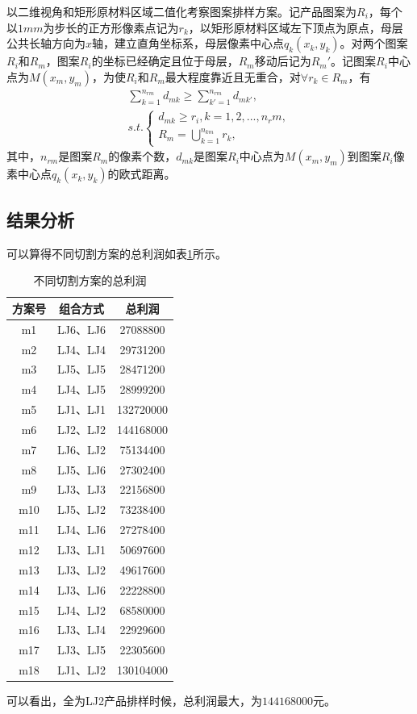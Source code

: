 \documentclass{whutmod}
\begin{document}
  	以二维视角和矩形原材料区域二值化考察图案排样方案。记产品图案为$R_i$，每个以$1mm$为步长的正方形像素点记为$r_k$，以矩形原材料区域左下顶点为原点，母层公共长轴方向为$x$轴，建立直角坐标系，母层像素中心点$q_k(x_k,y_k)$。对两个图案$R_i$和$R_m$，图案$R_i$的坐标已经确定且位于母层，$R_m$移动后记为$R_m'$。记图案$R_i$中心点为$M(x_m,y_m)$，为使$R_i$和$R_m$最大程度靠近且无重合，对$\forall r_k \in R_m$，有
  	\begin{gather}
  	\sum_{k=1}^{n_{rm}}d_{mk}\geq\sum_{k'=1}^{n_{rm}}d_{mk'},\\
  	s.t.\left\{\begin{matrix}
  	d_{mk}\geq r_i,k=1,2,...,n_rm,
  	\\ 
  	R_m=\bigcup_{k=1}^{n_{km}}r_k,
  	\end{matrix}\right.
  	\end{gather}
  	其中，$n_{rm}$是图案$R_m$的像素个数，$d_{mk}$是图案$R_i$中心点为$M(x_m,y_m)$到图案$R_i$像素中心点$q_k(x_k,y_k)$的欧式距离。
  	

  	\subsection{结果分析}
  	
  	可以算得不同切割方案的总利润如表\ref{sgzai}所示。
	\begin{table}[H]
		\centering		
		\caption{不同切割方案的总利润}\label{sgzai}
		\begin{tabular}{ccc}
			\toprule[2pt]
			\multicolumn{1}{m{3cm}}{\centering 方案号}
			& \multicolumn{1}{m{4cm}}{\centering 组合方式}
			& \multicolumn{1}{m{4cm}}{\centering 总利润}\\
			\midrule[1pt]
			m1 &  LJ6、LJ6&27088800\\ 
			m2 &  LJ4、LJ4&29731200\\ 
			m3 &  LJ5、LJ5&28471200\\ 
			m4 &  LJ4、LJ5&28999200\\ 
			m5 &  LJ1、LJ1&132720000\\ 
			m6 &  LJ2、LJ2&144168000\\ 
			m7 &  LJ6、LJ2&75134400\\ 
			m8 &  LJ5、LJ6&27302400\\ 
			m9 &  LJ3、LJ3&22156800\\ 
			m10 &  LJ5、LJ2&73238400\\ 
			m11 &  LJ4、LJ6&27278400\\ 
			m12 &  LJ3、LJ1&50697600\\ 
			m13 &  LJ3、LJ2&49617600\\ 
			m14 &  LJ3、LJ6&22228800	\\ 
			m15 &  LJ4、LJ2&68580000\\ 
			m16 &  LJ3、LJ4&22929600\\ 
			m17 &  LJ3、LJ5&22305600\\ 
			m18 &  LJ1、LJ2&130104000\\ 
			\bottomrule[2pt]	
		\end{tabular}
	\end{table}
	可以看出，全为LJ2产品排样时候，总利润最大，为$144168000$元。
\end{document}
